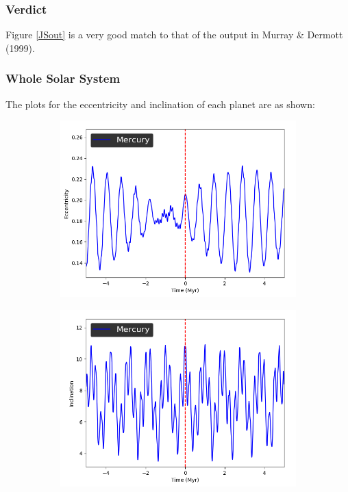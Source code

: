 \documentclass[11pt, oneside]{article}   	%
\begin{document}
\subsubsection*{Verdict}

Figure \ref{JSout} is a very good match to that of the output in Murray \& Dermott (1999)\cite{ssd}.

\subsubsection{Whole Solar System}

The plots for the eccentricity and inclination of each planet are as shown:
\begin{figure}[!h]
    \centering
    \begin{subfigure}[t]{0.49\textwidth}
    \captionsetup{width=0.9\textwidth}
	\centering
       	 \includegraphics[width=\textwidth]{Eccentricity_Mercury}
    \end{subfigure}
    \begin{subfigure}[t]{0.49\textwidth}
    \captionsetup{width=0.9\textwidth}
        	\centering
	\includegraphics[width=\textwidth]{Inclination_Mercury}
    \end{subfigure}
\end{figure}
\end{document}
